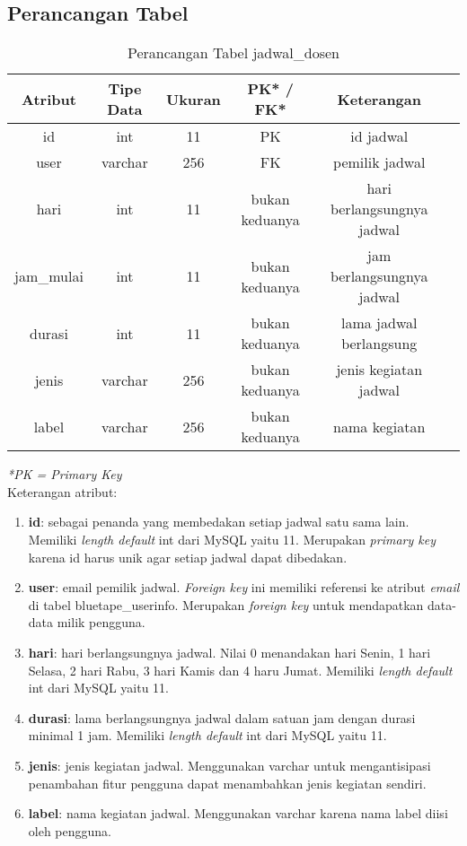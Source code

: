 \subsection{Perancangan Tabel}
\begin{center}
	\begin{table}[H]
	\caption{Perancangan Tabel jadwal\_dosen}
	\begin{tabular}{|c|c|c|c|c|c|}
 			\hline
		\textbf{Atribut} & \textbf{Tipe Data} & \textbf{Ukuran} & \textbf{PK* / FK*}  & \textbf{Keterangan} \\
			\hline
		 id & int & 11 & PK &  id jadwal\\
			 \hline
			 user & varchar & 256 & FK &   pemilik jadwal\\
			 \hline
			 hari & int & 11 & bukan keduanya &   hari berlangsungnya jadwal\\
			 \hline
			 jam\_mulai & int & 11 & bukan keduanya &  jam berlangsungnya jadwal\\
			 \hline
			 durasi & int & 11 & bukan keduanya &  lama jadwal berlangsung\\
			 \hline
			 jenis & varchar & 256 & bukan keduanya &  jenis kegiatan jadwal\\
			 \hline
			 label & varchar & 256 & bukan keduanya &   nama kegiatan\\
			 \hline
	\end{tabular}
	\end{table}
\end{center}
\textit{*PK = Primary Key} \\
Keterangan atribut:
	\begin{enumerate}
		\item \textbf{id}: sebagai penanda yang membedakan setiap jadwal satu sama lain. Memiliki \textit{length default} int dari MySQL yaitu 11. Merupakan \textit{primary key} karena id harus unik agar setiap jadwal dapat dibedakan.
		\item \textbf{user}: email pemilik jadwal. \textit{Foreign key }ini memiliki referensi ke atribut \textit{email} di tabel bluetape\_userinfo. Merupakan \textit{foreign key} untuk mendapatkan data-data milik pengguna.
		\item \textbf{hari}: hari berlangsungnya jadwal. Nilai 0 menandakan hari Senin, 1 hari Selasa, 2 hari Rabu, 3 hari Kamis dan 4 haru Jumat.  Memiliki \textit{length default} int dari MySQL yaitu 11.
		\item \textbf{durasi}: lama berlangsungnya jadwal dalam satuan jam dengan durasi minimal 1 jam.  Memiliki \textit{length default} int dari MySQL yaitu 11.
		\item \textbf{jenis}: jenis kegiatan jadwal. Menggunakan varchar untuk mengantisipasi penambahan fitur pengguna dapat menambahkan jenis kegiatan sendiri.
		\item \textbf{label}: nama kegiatan jadwal. Menggunakan varchar karena nama label diisi oleh pengguna.
	\end{enumerate}

